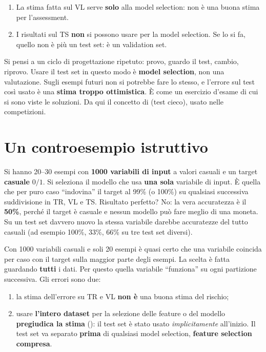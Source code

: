 \begin{attenzione}
\begin{enumerate}
  \item La stima fatta sul VL serve \textbf{solo} alla model selection: non è una buona stima per l'assessment.
  \item I risultati sul TS \textbf{non} si possono usare per la model selection. Se lo si fa, quello non è più
        un test set: è un validation set.
\end{enumerate}
\end{attenzione}

Si pensi a un ciclo di progettazione ripetuto: provo, guardo il test, cambio, riprovo. Usare il test set in
questo modo è \textbf{model selection}, non una valutazione. Sugli esempi futuri non si potrebbe fare lo stesso, e
l'errore sul test così usato è una \textbf{stima troppo ottimistica}. È come un esercizio d'esame di cui si sono
viste le soluzioni. Da qui il concetto di  (test cieco), usato nelle competizioni.

\section{Un controesempio istruttivo}
\label{sec:controesempio}

\begin{esempio}
Si hanno 20--30 esempi con \textbf{1000 variabili di input} a valori casuali e un target \textbf{casuale}
$0/1$. Si seleziona il modello che usa \textbf{una sola} variabile di input. È quella che per puro caso
``indovina'' il target al 99\% (o 100\%) su qualsiasi successiva suddivisione in TR, VL e TS. Risultato perfetto?
No: la vera accuratezza è il \textbf{50\%}, perché il target è casuale e nessun modello può fare meglio di una
moneta. Su un test set davvero nuovo la stessa variabile darebbe accuratezze del tutto casuali (ad esempio 100\%,
33\%, 66\% su tre test set diversi).
\end{esempio}

Con 1000 variabili casuali e soli 20 esempi è quasi certo che una variabile coincida per caso con il target sulla
maggior parte degli esempi. La scelta è fatta guardando \textbf{tutti} i dati. Per questo quella variabile
``funziona'' su ogni partizione successiva. Gli errori sono due:
\begin{enumerate}
  \item[(1)] la stima dell'errore su TR e VL \textbf{non è} una buona stima del rischio;
  \item[(2)] usare \textbf{l'intero dataset} per la selezione delle feature o del modello \textbf{pregiudica la
        stima} (): il test set è stato usato \emph{implicitamente} all'inizio. Il
        test set va separato \textbf{prima} di qualsiasi model selection, \textbf{feature selection compresa}.
\end{enumerate}

